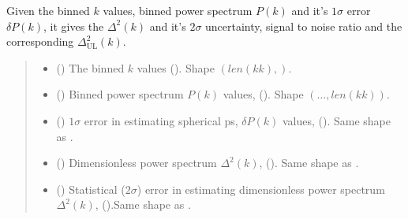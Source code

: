 \documentclass[a4paper,11pt,oneside,english,openany]{sphinxmanual}
\begin{document}
\begin{fulllineitems}
\label{\detokenize{psestimation:psestimation.func_dT}}
\pysigstartsignatures
{}
\pysigstopsignatures
\sphinxAtStartPar
Given the binned \(k\) values, binned power spectrum \(P(k)\) and it’s \(1\sigma\) error \(\delta P(k)\), it gives the  \(\Delta^2(k)\) and it’s \(2\sigma\) uncertainty, signal to noise ratio  and the corresponding  \(\Delta^2_{\text{UL}}(k)\).
\begin{quote}\begin{description}
\begin{itemize}
\item {} 
\sphinxAtStartPar
{} () \textendash{} The binned \(k\) values (). Shape \((len(kk),)\).

\item {} 
\sphinxAtStartPar
{} () \textendash{} Binned power spectrum \(P(k)\) values, (). Shape  \((\dots,len(kk))\).

\item {} 
\sphinxAtStartPar
{} () \textendash{} \(1\sigma\) error in estimating spherical ps, \(\delta P(k)\) values, (). Same shape as .

\end{itemize}

\sphinxAtStartPar
\begin{itemize}
\item {} 
\sphinxAtStartPar
{} () \textendash{} Dimensionless power spectrum \(\Delta^2(k)\), (). Same shape as .

\item {} 
\sphinxAtStartPar
{} () \textendash{} Statistical (\(2\sigma\)) error in estimating dimensionless power spectrum \(\Delta^2(k)\), ().Same shape as .


\end{itemize}
\end{description}
\end{quote}
\end{fulllineitems}
\end{document}
